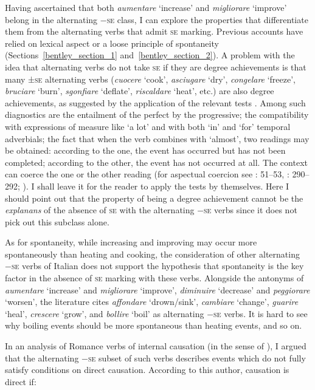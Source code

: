 \documentclass[output=paper,colorlinks,citecolor=brown
]{langscibook}
\begin{document}
Having ascertained that both \textit{aumentare} ‘increase’ and \textit{migliorare} ‘improve’ belong in the alternating −\textsc{se} class, I can explore the properties that differentiate them from the alternating verbs that admit \textsc{se} marking. Previous accounts have relied on lexical aspect or a loose principle of spontaneity (Sections~\ref{bentley_section_1} and~\ref{bentley_section_2}). A problem with the idea that alternating verbs do not take \textsc{se} if they are degree achievements is that many ±\textsc{se} alternating verbs (\textit{cuocere} ‘cook’, \textit{asciugare} ‘dry’, \textit{congelare} ‘freeze’, \textit{bruciare} ‘burn’, \textit{sgonfiare} ‘deflate’, \textit{riscaldare} ‘heat’, etc.) are also degree achievements, as suggested by the application of the relevant tests \citep{dowty1979word,bertinetto1995attempt,hay1999scalar}. Among such diagnostics are the entailment of the perfect by the progressive; the compatibility with expressions of measure like ‘a lot’ and with both ‘in’ and ‘for’ temporal adverbials; the fact that when the verb combines with ‘almost’, two readings may be obtained: according to the one, the event has occurred but has not been completed; according to the other, the event has not occurred at all. The context can coerce the one or the other reading (for aspectual coercion see \cite{jackendoff1997architecture}: 51--53, \cite{jackendoff2002foundations}: 290--292; \cite{pustejovsky1991syntax}). I shall leave it for the reader to apply the tests by themselves. Here I should point out that the property of being a degree achievement cannot be the \textit{explanans} of the absence of \textsc{se} with the alternating −\textsc{se} verbs since it does not pick out this subclass alone. 

As for spontaneity, while increasing and improving may occur more spontaneously than heating and cooking, the consideration of other alternating −\textsc{se} verbs of Italian does not support the hypothesis that spontaneity is the key factor in the absence of \textsc{se} marking with these verbs. Alongside the antonyms of \textit{aumentare} ‘increase’ and \textit{migliorare} ‘improve’, \textit{diminuire} ‘decrease’ and \textit{peggiorare} ‘worsen’, the literature cites \textit{affondare} ‘drown/sink’, \textit{cambiare} ‘change’, \textit{guarire} ‘heal’, \textit{crescere} ‘grow’, and \textit{bollire} ‘boil’ as alternating −\textsc{se} verbs. It is hard to see why boiling events should be more spontaneous than heating events, and so on.

In an analysis of Romance verbs of internal causation (in the sense of \cite{levin1995unaccusativity}), I argued that the alternating −\textsc{se} subset of such verbs describes events which do not fully satisfy  conditions on direct causation. According to this author, causation is direct if:
\end{document}
